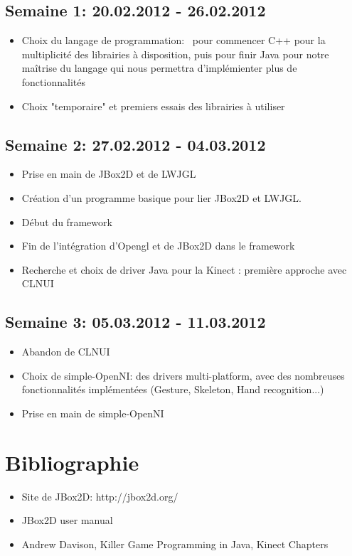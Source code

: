 \documentclass{article}
\begin{document}
	\subsection*{Semaine 1: 20.02.2012 - 26.02.2012}
		\begin{itemize}
  			\item Choix du langage de programmation: \
  			pour commencer C++ pour la multiplicité des librairies à disposition, puis pour finir Java pour notre maîtrise du langage qui nous permettra d'implémienter plus de fonctionnalités
  			\item Choix "temporaire" et premiers essais des librairies à utiliser
  		\end{itemize}
  		
	\subsection*{Semaine 2: 27.02.2012 - 04.03.2012}
		\begin{itemize}
  			\item Prise en main de JBox2D et de LWJGL
  			\item Création d'un programme basique pour lier JBox2D et LWJGL.
  			\item Début du framework
  			\item Fin de l'intégration d'Opengl et de JBox2D dans le framework
  			\item Recherche et choix de driver Java pour la Kinect : première approche avec CLNUI
  		\end{itemize}

	\subsection*{Semaine 3: 05.03.2012 - 11.03.2012}
		\begin{itemize}
  			\item Abandon de CLNUI
  			\item Choix de simple-OpenNI: des drivers multi-platform, avec des nombreuses fonctionnalités implémentées (Gesture, Skeleton, Hand recognition...)
  			\item Prise en main de simple-OpenNI
  		\end{itemize}



\section{Bibliographie}
	\begin{itemize}
		\item Site de JBox2D: http://jbox2d.org/
		\item JBox2D user manual
		\item Andrew Davison, Killer Game Programming in Java, Kinect Chapters
	\end{itemize}

  		
\end{document}

